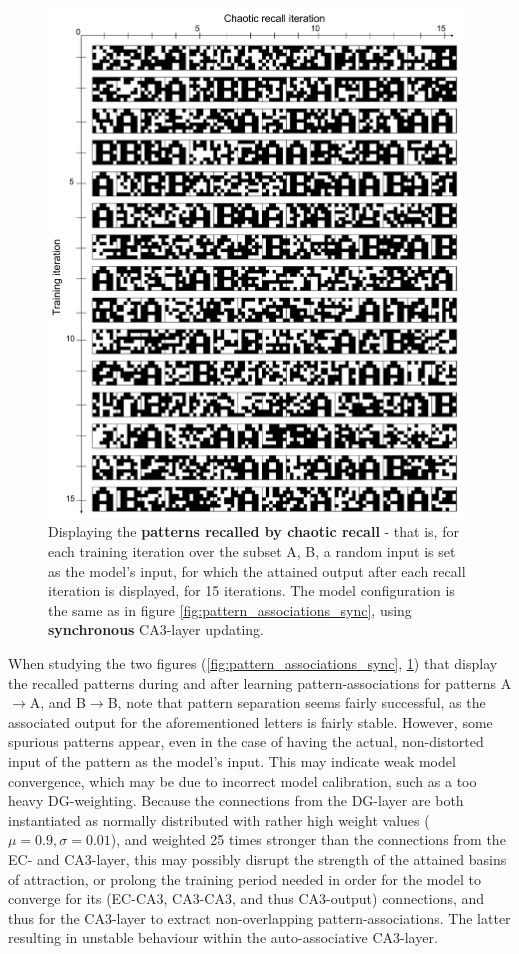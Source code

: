 \begin{figure}
    \centering
    \includegraphics[width=11cm]{fig/AB-chaotic-recall-sync-tm0-dgw25}
    \caption{Displaying the \textbf{patterns recalled by chaotic recall} - that is, for each training iteration over the subset {A, B}, a random input is set as the model's input, for which the attained output after each recall iteration is displayed, for 15 iterations. The model configuration is the same as in figure \ref{fig:pattern_associations_sync}, using \textbf{synchronous} CA3-layer updating.}
    \label{fig:chaotic_recall_sync}
\end{figure}

When studying the two figures (\ref{fig:pattern_associations_sync}, \ref{fig:chaotic_recall_sync}) that display the recalled patterns during and after learning pattern-associations for patterns A$\rightarrow$A, and B$\rightarrow$B, note that pattern separation seems fairly successful, as the associated output for the aforementioned letters is fairly stable. However, some spurious patterns appear, even in the case of having the actual, non-distorted input of the pattern as the model's input. This may indicate weak model convergence, which may be due to incorrect model calibration, such as a too heavy DG-weighting. Because the connections from the DG-layer are both instantiated as normally distributed with rather high weight values ($\mu=0.9, \sigma=0.01$), and weighted 25 times stronger than the connections from the EC- and CA3-layer, this may possibly disrupt the strength of the attained basins of attraction, or prolong the training period needed in order for the model to converge for its (EC-CA3, CA3-CA3, and thus CA3-output) connections, and thus for the CA3-layer to extract non-overlapping pattern-associations. The latter resulting in unstable behaviour within the auto-associative CA3-layer.

